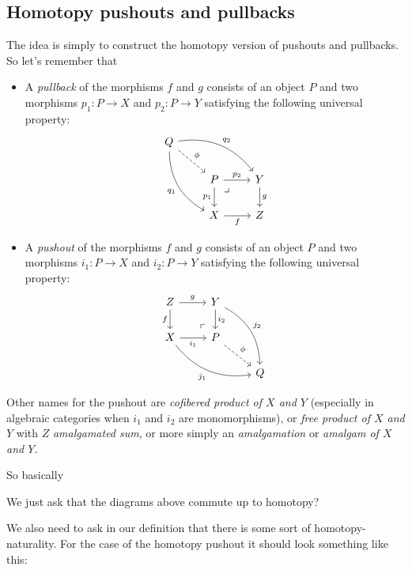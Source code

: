 \subsection{Homotopy pushouts and pullbacks}
The idea is simply to construct the homotopy version of pushouts and pullbacks. So let's remember that
\begin{definition}  
	\begin{itemize}
		\item A {\it pullback} of the morphisms $f$ and $g$ consists of an object $P$ and two morphisms $p_1:P\to X$ and $p_2:P\to Y$ satisfying the following universal property:
		$$\begin{tikzcd}
			Q\arrow[rrd,bend left,"q_2"]\arrow[ddr,"q_1",swap,bend right]\arrow[dr,dashed,"\phi"]\\
			&P\arrow[r,"p_2"] \arrow[rd, phantom, "\lrcorner", very near start]\arrow[d,"p_1",swap]&Y\arrow[d,"g"]\\
			&X\arrow[r,"f",swap]&Z
		\end{tikzcd}$$
		\item A {\it pushout} of the morphisms $f$ and $g$ consists of an object $P$ and two morphisms $i_1:P\to X$ and $i_2:P\to Y$ satisfying the following universal property:
		$$\begin{tikzcd}
			Z\arrow[r,"g"]\arrow[d,swap,"f"]&Y\arrow[d,"i_2"]\arrow[ddr,bend left,"j_2"]\\
			X\arrow[r,"i_1",swap]\arrow[drr,bend right,swap,"j_1"]&P\arrow[ul, phantom, "\ulcorner", very near start]\arrow[dr,dashed,"\phi"]\\
			&&Q
		\end{tikzcd}$$
\end{itemize}
\begin{remark}
Other names for the pushout are {\it cofibered product of $X$ and $Y$} (especially in algebraic categories when $i_1$ and $i_2$ are monomorphisms), or {\it free product of $X$ and $Y$} with $Z$ {\it amalgamated sum}, or more simply an {\it amalgamation} or {\it amalgam of $X$ and $Y$.}
\end{remark}
So basically
\begin{definition}
	{\color{magenta}We just ask that the diagrams above commute up to homotopy?}
\end{definition}
\begin{remark}
	We also need to ask in our definition that there is some sort of homotopy-naturality. For the case of the homotopy pushout it should look something like this:

\end{remark}
\end{definition}
